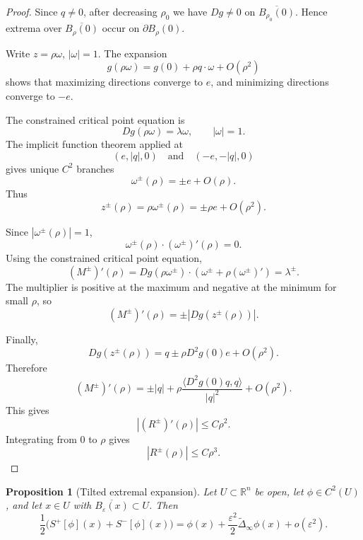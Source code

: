 \documentclass[12pt,reqno]{amsart}
\numberwithin{equation}{section}
\theoremstyle{plain}
\newtheorem{proposition}[proposition]{Proposition}
\theoremstyle{definition}
\theoremstyle{remark}
\newcommand{\R}{\mathbb{R}}
\newcommand{\Sp}{S^+}
\newcommand{\Sm}{S^-}
\newcommand{\DeltaiR}{\widetilde\Delta_\infty}
\begin{document}
\begin{proof}
Since $q\ne0$, after decreasing $\rho_0$ we have $Dg\ne0$ on
$\overline{B_{\rho_0}(0)}$. Hence extrema over
$\overline{B_\rho(0)}$ occur on $\partial B_\rho(0)$.

Write $z=\rho\omega$, $|\omega|=1$. The expansion
\[
  g(\rho\omega)
  =
  g(0)+\rho q\cdot\omega+O(\rho^2)
\]
shows that maximizing directions converge to $e$, and minimizing
directions converge to $-e$.

The constrained critical point equation is
\[
  Dg(\rho\omega)=\lambda\omega,
  \qquad
  |\omega|=1.
\]
The implicit function theorem applied at
\[
  (e,|q|,0)
  \quad\text{and}\quad
  (-e,-|q|,0)
\]
gives unique $C^2$ branches
\[
  \omega^\pm(\rho)=\pm e+O(\rho).
\]
Thus
\[
  z^\pm(\rho)=\rho\omega^\pm(\rho)=\pm\rho e+O(\rho^2).
\]

Since $|\omega^\pm(\rho)|=1$,
\[
  \omega^\pm(\rho)\cdot(\omega^\pm)'(\rho)=0.
\]
Using the constrained critical point equation,
\[
  (M^\pm)'(\rho)
  =
  Dg(\rho\omega^\pm)
  \cdot
  \left(
    \omega^\pm+\rho(\omega^\pm)'
  \right)
  =
  \lambda^\pm.
\]
The multiplier is positive at the maximum and negative at the minimum for
small $\rho$, so
\[
  (M^\pm)'(\rho)
  =
  \pm|Dg(z^\pm(\rho))|.
\]

Finally,
\[
  Dg(z^\pm(\rho))
  =
  q\pm\rho D^2g(0)e+O(\rho^2).
\]
Therefore
\[
  (M^\pm)'(\rho)
  =
  \pm |q|
  +
  \rho
  \frac{\langle D^2g(0)q,q\rangle}{|q|^2}
  +
  O(\rho^2).
\]
This gives
\[
  |(R^\pm)'(\rho)|\le C\rho^2.
\]
Integrating from $0$ to $\rho$ gives
\[
  |R^\pm(\rho)|\le C\rho^3.
\]
\end{proof}

\begin{proposition}[Tilted extremal expansion]
\label{prop:pinf}
Let $U\subset\R^n$ be open, let $\phi\in C^2(U)$, and let
$x\in U$ with $\overline{B_\varepsilon(x)}\subset U$. Then
\begin{equation}\label{eq:pinf-expand}
  \frac12
  \bigl(\Sp[\phi](x)+\Sm[\phi](x)\bigr)
  =
  \phi(x)
  +
  \frac{\varepsilon^2}{2}
  \DeltaiR\phi(x)
  +
  o(\varepsilon^2).
\end{equation}
\end{proposition}
\end{document}
